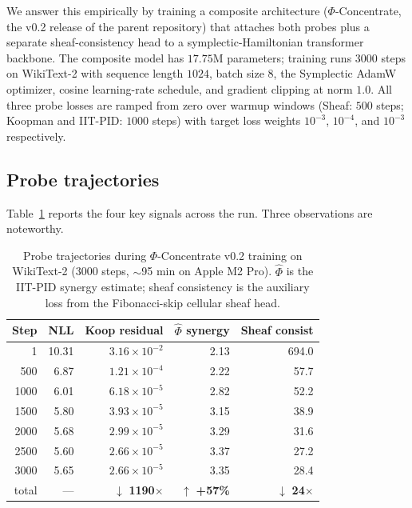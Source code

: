 \documentclass[11pt]{article}
\begin{document}
We answer this empirically by training a composite architecture
($\Phi$-Concentrate, the v0.2 release of the parent repository) that
attaches both probes plus a separate sheaf-consistency head to a
symplectic-Hamiltonian transformer backbone. The composite model has
$17.75$M parameters; training runs $3000$ steps on WikiText-2 with
sequence length $1024$, batch size $8$, the Symplectic AdamW optimizer,
cosine learning-rate schedule, and gradient clipping at norm $1.0$. All
three probe losses are ramped from zero over warmup windows (Sheaf:
$500$ steps; Koopman and IIT-PID: $1000$ steps) with target loss weights
$10^{-3}$, $10^{-4}$, and $10^{-3}$ respectively.

\subsection{Probe trajectories}

Table~\ref{tab:probe-trajectories} reports the four key signals across
the run. Three observations are noteworthy.

\begin{table}[h]
\centering
\caption{Probe trajectories during $\Phi$-Concentrate v0.2 training on
WikiText-2 (3000 steps, $\sim$95 min on Apple M2 Pro). $\hat{\Phi}$ is
the IIT-PID synergy estimate; sheaf consistency is the auxiliary loss
from the Fibonacci-skip cellular sheaf head.}
\label{tab:probe-trajectories}
\begin{tabular}{rrrrr}
\toprule
Step & NLL & Koop residual & $\hat{\Phi}$ synergy & Sheaf consist \\
\midrule
1     & 10.31 & $3.16 \times 10^{-2}$ & 2.13 & 694.0 \\
500   &  6.87 & $1.21 \times 10^{-4}$ & 2.22 &  57.7 \\
1000  &  6.01 & $6.18 \times 10^{-5}$ & 2.82 &  52.2 \\
1500  &  5.80 & $3.93 \times 10^{-5}$ & 3.15 &  38.9 \\
2000  &  5.68 & $2.99 \times 10^{-5}$ & 3.29 &  31.6 \\
2500  &  5.60 & $2.66 \times 10^{-5}$ & 3.37 &  27.2 \\
3000  &  5.65 & $2.66 \times 10^{-5}$ & 3.35 &  28.4 \\
\midrule
total & --- & $\downarrow$ \textbf{1190$\times$} & $\uparrow$ \textbf{+57\%} & $\downarrow$ \textbf{24$\times$} \\
\bottomrule
\end{tabular}
\end{table}
\end{document}
